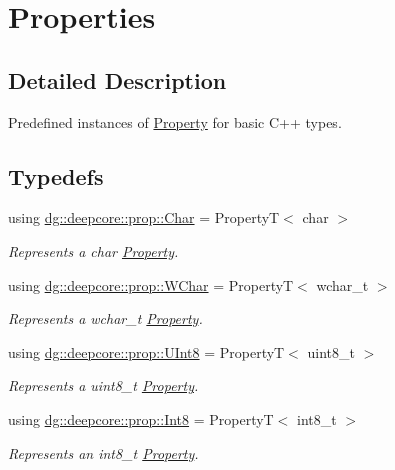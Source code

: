 \hypertarget{group___process_properties}{}\section{Properties}
\label{group___process_properties}


\subsection{Detailed Description}
Predefined instances of \hyperlink{classdg_1_1deepcore_1_1_property}{Property} for basic C++ types. 

\subsection*{Typedefs}
\begin{DoxyCompactItemize}
\item 
using \hyperlink{group___process_properties_ga2ba635b306b0b9966b3b14da127b9fd4}{dg\+::deepcore\+::prop\+::\+Char} = PropertyT$<$ char $>$
\begin{DoxyCompactList}\small\item\em Represents a {\ttfamily char} \hyperlink{classdg_1_1deepcore_1_1_property}{Property}. \end{DoxyCompactList}\item 
using \hyperlink{group___process_properties_ga0259b5488d3e8eb0dca8d4ff630eb90f}{dg\+::deepcore\+::prop\+::\+W\+Char} = PropertyT$<$ wchar\+\_\+t $>$
\begin{DoxyCompactList}\small\item\em Represents a {\ttfamily wchar\+\_\+t} \hyperlink{classdg_1_1deepcore_1_1_property}{Property}. \end{DoxyCompactList}\item 
using \hyperlink{group___process_properties_ga00cfe1be5c63a967b6b7e7d518393d97}{dg\+::deepcore\+::prop\+::\+U\+Int8} = PropertyT$<$ uint8\+\_\+t $>$
\begin{DoxyCompactList}\small\item\em Represents a {\ttfamily uint8\+\_\+t} \hyperlink{classdg_1_1deepcore_1_1_property}{Property}. \end{DoxyCompactList}\item 
using \hyperlink{group___process_properties_gabc81c32ee6c2b6a9b8d3dead18f3d336}{dg\+::deepcore\+::prop\+::\+Int8} = PropertyT$<$ int8\+\_\+t $>$
\begin{DoxyCompactList}\small\item\em Represents an {\ttfamily int8\+\_\+t} \hyperlink{classdg_1_1deepcore_1_1_property}{Property}. \end{DoxyCompactList}\item 

\end{DoxyCompactItemize}
